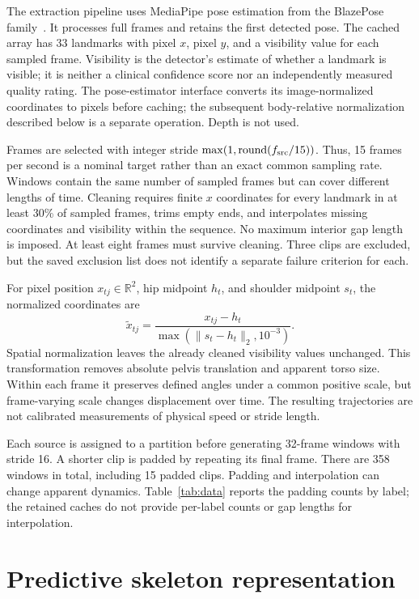 \documentclass[10pt,twocolumn,letterpaper]{article}
\begin{document}
The extraction pipeline uses MediaPipe pose estimation from the BlazePose family~\cite{blazepose}. It processes full frames and retains the first detected pose. The cached array has 33 landmarks with pixel $x$, pixel $y$, and a visibility value for each sampled frame. Visibility is the detector's estimate of whether a landmark is visible; it is neither a clinical confidence score nor an independently measured quality rating. The pose-estimator interface converts its image-normalized coordinates to pixels before caching; the subsequent body-relative normalization described below is a separate operation. Depth is not used.

Frames are selected with integer stride $\max(1,\operatorname{round}(f_{\rm src}/15))$. Thus, 15 frames per second is a nominal target rather than an exact common sampling rate. Windows contain the same number of sampled frames but can cover different lengths of time. Cleaning requires finite $x$ coordinates for every landmark in at least 30\% of sampled frames, trims empty ends, and interpolates missing coordinates and visibility within the sequence. No maximum interior gap length is imposed. At least eight frames must survive cleaning. Three clips are excluded, but the saved exclusion list does not identify a separate failure criterion for each.

For pixel position $x_{tj}\in\mathbb{R}^2$, hip midpoint $h_t$, and shoulder midpoint $s_t$, the normalized coordinates are
\begin{equation}
\widetilde{x}_{tj}=\frac{x_{tj}-h_t}{\max(\|s_t-h_t\|_2,10^{-3})}.
\label{eq:normalization}
\end{equation}
Spatial normalization leaves the already cleaned visibility values unchanged. This transformation removes absolute pelvis translation and apparent torso size. Within each frame it preserves defined angles under a common positive scale, but frame-varying scale changes displacement over time. The resulting trajectories are not calibrated measurements of physical speed or stride length.

Each source is assigned to a partition before generating 32-frame windows with stride 16. A shorter clip is padded by repeating its final frame. There are 358 windows in total, including 15 padded clips. Padding and interpolation can change apparent dynamics. Table~\ref{tab:data} reports the padding counts by label; the retained caches do not provide per-label counts or gap lengths for interpolation.

\section{Predictive skeleton representation}
\end{document}
